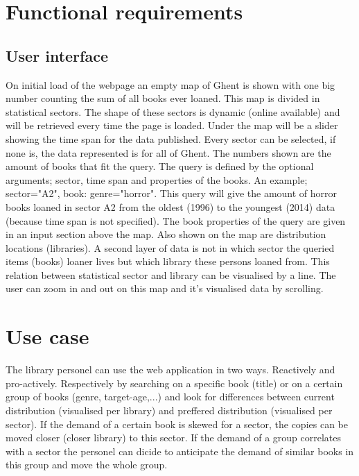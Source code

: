 \section{Functional requirements}

\subsection{User interface}

On initial load of the webpage an empty map of Ghent is shown with one big number counting the sum of all books ever loaned. This map is divided in statistical sectors. The shape of these sectors is dynamic (online available) and will be retrieved every time the page is loaded. Under the map will be a slider showing the time span for the data published. Every sector can be selected, if none is, the data represented is for all of Ghent.  The numbers shown are the amount of books that fit the query. The query is defined by the optional arguments; sector, time span and properties of the books. An example; sector="A2", book: genre="horror". This query will give the amount of horror books loaned in sector A2 from the oldest (1996) to the youngest (2014) data (because time span is not specified). The book properties of the query are given in an input section above the map. Also shown on the map are distribution locations (libraries). A second layer of data is not in which sector the queried items (books) loaner lives but which library these persons  loaned from. This relation between statistical sector and library can be visualised by a line. The user can zoom in and out on this map and it's visualised data by scrolling. 

\section{Use case}

The library personel can use the web application in two ways. Reactively and pro-actively. Respectively by searching on a specific book (title) or on a certain group of books (genre, target-age,...) and look for differences between current distribution (visualised per library) and preffered distribution (visualised per sector). If the demand of a certain book is skewed for a  sector, the copies can be moved closer (closer library) to this sector. If the demand of a group correlates with a sector the personel can dicide to anticipate the demand of similar books in this group and move the whole group. 